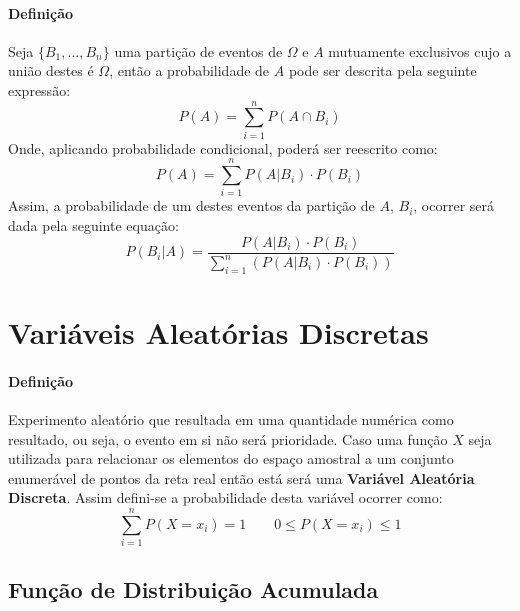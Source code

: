 \documentclass{article}
\begin{document}
            \paragraph{Definição}Seja $\{B_{1}, ... , B_{n}\}$ uma partição de eventos de $\Omega$ e $A$ mutuamente exclusivos cujo a união destes é $\Omega$, então a probabilidade de $A$ pode ser descrita pela seguinte expressão:
                \[
                    P(A) = \sum_{i=1}^{n} P(A\cap B_{i})
                \]
            Onde, aplicando probabilidade condicional, poderá ser reescrito como:
                \[
                    P(A) = \sum_{i=1}^{n} P(A|B_{i})\cdot P(B_{i})
                \]
            Assim, a probabilidade de um destes eventos da partição de $A$, $B_{i}$, ocorrer será dada pela seguinte equação:
                \begin{equation}
                    \boxed{
                        P(B_{i} | A) = \frac{P(A | B_{i}) \cdot P(B_{i})}{\sum\limits_{i=1}^{n} \left(P(A | B_{i}) \cdot P(B_{i})\right)}
                    }
                \end{equation}
\newpage

    \section{Variáveis Aleatórias Discretas}
        \paragraph{Definição}Experimento aleatório que resultada em uma quantidade numérica como resultado, ou seja, o evento em si não será prioridade. Caso uma função $X$ seja utilizada para relacionar os elementos do espaço amostral a um conjunto enumerável de pontos da reta real então está será uma \textbf{Variável Aleatória Discreta}. Assim defini-se a probabilidade desta variável ocorrer como:
            \begin{equation}
                \boxed{
                    \sum_{i=1}^{n} P(X = x_{i}) = 1
                }
                \qquad
                \boxed{
                    0 \le P(X = x_{i}) \le 1
                }
            \end{equation}

        \subsection{Função de Distribuição Acumulada}
\end{document}
